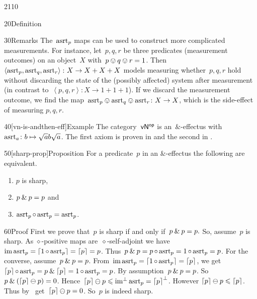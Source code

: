 \begin{parsec}{2110}
\begin{point}{20}{Definition}
\begin{point}{30}{Remarks}
The~$\mathrm{asrt}_p$ maps can be used to construct more complicated measurements.
For instance, let~$p, q, r$ be three predicates (measurement outcomes)
    on an object~$X$
    with~$p \ovee q \ovee r = 1$.
Then~$\left<\mathrm{asrt}_p,\mathrm{asrt}_q,\mathrm{asrt}_r\right>\colon X \to X + X + X $
    models measuring whether~$p,q,r$ hold
    without discarding the state of the (possibly affected) system
    after measurement
    (in contrast to~$\left<p,q,r\right>\colon X \to 1+1+1$).
If we discard the measurement outcome,
    we find the map~$\mathrm{asrt}_p \ovee \mathrm{asrt}_q \ovee \mathrm{asrt}_r \colon X \to X$,
    which is the side-effect of measuring $p,q,r$.
\end{point}
\end{point}
\begin{point}{40}[vn-is-andthen-eff]{Example}%
The category~${\mathsf{vN}}{^{\mathsf{op}}}$ is an~$\&$-effectus
    with~$\mathrm{asrt}_a\colon b \mapsto \sqrt{a}b\sqrt{a}$.
The first axiom is proven in 
    and the second in .
\end{point}
\begin{point}{50}[sharp-prop]{Proposition}%
For a predicate~$p$ in an $\&$-effectus the following are equivalent.
\begin{enumerate}
\item $p$ is sharp,
\item $p \mathbin{\&} p=p$ and
\item $\mathrm{asrt}_p \mathop{\circ} \mathrm{asrt}_p = \mathrm{asrt}_p$.
\end{enumerate}
\begin{point}{60}{Proof}%
First we prove that~$p$ is sharp if and only if~$p \mathbin{\&} p=p.$
So, assume~$p$ is sharp.
As $\diamond$-positive maps are~$\diamond$-self-adjoint
    we have~$\operatorname{im} \mathrm{asrt}_p = \left\lceil1 \mathop{\circ} \mathrm{asrt}_p\right\rceil = \left\lceil p\right\rceil = p$.
Thus~$p \mathbin{\&} p = p \mathop{\circ} \mathrm{asrt}_p = 1 \mathop{\circ} \mathrm{asrt}_p = p$.
For the converse, assume~$p \mathbin{\&} p=p$.
From~$\operatorname{im} \mathrm{asrt}_p = \left\lceil1 \mathop{\circ} \mathrm{asrt}_p\right\rceil = \left\lceil p\right\rceil$,
we get~$\left\lceil p\right\rceil \mathop{\circ} \mathrm{asrt}_p = p \mathbin{\&} \left\lceil p\right\rceil = 1 \mathop{\circ} \mathrm{asrt}_p = p$.
By assumption~$p \mathbin{\&} p=p$.
So~$p \mathbin{\&} (\left\lceil p\right\rceil \ominus p) = 0$.
Hence~$\left\lceil p\right\rceil\ominus p \leqslant \operatorname{im^\perp} \mathrm{asrt}_p = \left\lceil p\right\rceil^\perp$.
However $\left\lceil p\right\rceil\ominus p \leqslant \left\lceil p\right\rceil$.
Thus by~
    get~$\left\lceil p\right\rceil \ominus p = 0$. So~$p$ is indeed sharp.


\end{point}
\end{point}
\end{parsec}
